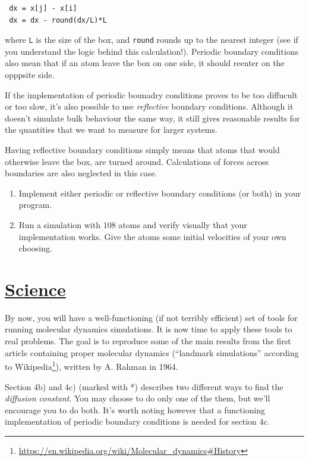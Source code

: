 \documentclass[11pt,english,a4paper]{report}
\begin{document}
\begin{lstlisting}
 dx = x[j] - x[i]
 dx = dx - round(dx/L)*L
\end{lstlisting}

where \texttt{L} is the size of the box, and \texttt{round} rounds up
to the nearest integer (see if you understand the logic behind this
calculation!). Periodic boundary conditions also mean that if an atom
leave the box on one side, it should reenter on the opppsite side.

If the implementation of periodic bounadry conditions proves to be too
diffucult or too slow, it's also possible to use \textit{reflective}
boundary conditions. Although it doesn't simulate bulk behaviour the
same way, it still gives reasonable results for the quantities that we
want to measure for larger systems.

Having reflective boundary conditions simply means that atoms that
would otherwise leave the box, are turned around. Calculations of
forces across boundaries are also neglected in this case.

\begin{enumerate}[label=\roman*.]
    \item Implement either periodic or reflective boundary conditions (or both) in your program.
    \item Run a simulation with \(108\) atoms and verify visually that your implementation works. Give the atoms some initial velocities of your own choosing.
\end{enumerate}



\section{\underline{Science}}

By now, you will have a well-functioning (if not terribly efficient)
set of tools for running molecular dynamics simulations. It is now
time to apply these tools to real problems. The goal is to reproduce
some of the main results from the first article containing proper
molecular dynamics (``landmark simulations'' according to
Wikipedia\footnote{\url{https://en.wikipedia.org/wiki/Molecular_dynamics\#History}}),
written by A. Rahman in 1964.

Section 4b) and 4c) (marked with *) describes two different ways to
find the \textit{diffusion constant}. You may choose to do only one of
the them, but we'll encourage you to do both. It's worth noting
however that a functioning implementation of periodic boundary
conditions is needed for section 4c.
\end{document}
